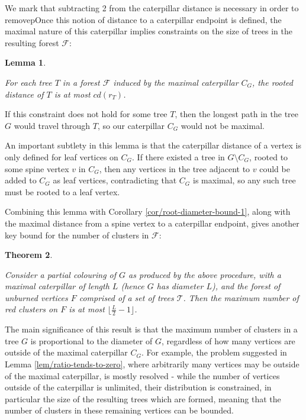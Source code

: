 \documentclass{mpaper}
\newtheorem{theorem}{Theorem}[section]
\newtheorem{lemma}[theorem]{Lemma}
\begin{document}
We mark that subtracting 2 from the caterpillar distance is necessary in order to removepOnce this notion of distance to a caterpillar endpoint is defined, the maximal nature of this caterpillar implies constraints on the size of trees in the resulting forest $\mathcal{F}$:

\begin{lemma}
\label{def/tree-size-constraint}

For each tree $T$ in a forest $\mathcal{F}$ induced by the maximal caterpillar $C_G$, the rooted distance of $T$ is at most $cd(r_T)$.

\end{lemma}

If this constraint does not hold for some tree $T$, then the longest path in the tree $G$ would travel through $T$, so our caterpillar $C_G$ would not be maximal.

An important subtlety in this lemma is that the caterpillar distance of a vertex is only defined for leaf vertices on $C_G$. If there existed a tree in $G \setminus C_G$, rooted to some spine vertex $v$ in $C_G$, then any vertices in the tree adjacent to $v$ could be added to $C_G$ as leaf vertices, contradicting that $C_G$ is maximal, so any such tree must be rooted to a leaf vertex.

Combining this lemma with Corollary \ref{cor/root-diameter-bound-1}, along with the maximal distance from a spine vertex to a caterpillar endpoint, gives another key bound for the number of clusters in $\mathcal{F}$:

\begin{theorem}
\label{thm/root-diameter-bound-2}

Consider a partial colouring of $G$ as produced by the above procedure, with a maximal caterpillar of length $L$ (hence $G$ has diameter $L$), and the forest of unburned vertices $F$ comprised of a set of trees $\mathcal{T}$. Then the maximum number of red clusters on $F$ is at most $\lfloor \frac{L}{2} - 1 \rfloor$.

\end{theorem}

The main significance of this result is that the maximum number of clusters in a tree $G$ is proportional to the diameter of $G$, regardless of how many vertices are outside of the maximal caterpillar $C_G$. For example, the problem suggested in Lemma \ref{lem/ratio-tends-to-zero}, where arbitrarily many vertices may be outside of the maximal caterpillar, is mostly resolved - while the number of vertices outside of the caterpillar is unlimited, their distribution is constrained, in particular the size of the resulting trees which are formed, meaning that the number of clusters in these remaining vertices can be bounded.
\end{document}
